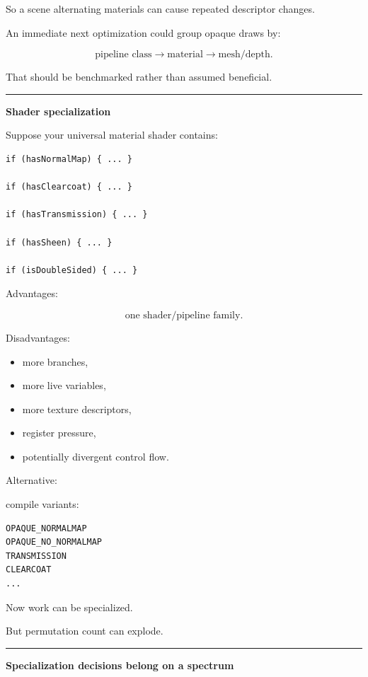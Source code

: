 So a scene alternating materials can cause repeated descriptor changes.

An immediate next optimization could group opaque draws by:

\[
\text{pipeline class}
\rightarrow
\text{material}
\rightarrow
\text{mesh/depth}.
\]

That should be benchmarked rather than assumed beneficial.

\begin{center}\rule{0.5\linewidth}{0.5pt}\end{center}

\textbf{Shader specialization}

Suppose your universal material shader contains:

\begin{verbatim}
if (hasNormalMap) { ... }

if (hasClearcoat) { ... }

if (hasTransmission) { ... }

if (hasSheen) { ... }

if (isDoubleSided) { ... }
\end{verbatim}

Advantages:

\[
\text{one shader/pipeline family}.
\]

Disadvantages:

\begin{itemize}
\tightlist
\item
  more branches,
\item
  more live variables,
\item
  more texture descriptors,
\item
  register pressure,
\item
  potentially divergent control flow.
\end{itemize}

Alternative:

compile variants:

\begin{verbatim}
OPAQUE_NORMALMAP
OPAQUE_NO_NORMALMAP
TRANSMISSION
CLEARCOAT
...
\end{verbatim}

Now work can be specialized.

But permutation count can explode.

\begin{center}\rule{0.5\linewidth}{0.5pt}\end{center}

\textbf{Specialization decisions belong on a spectrum}

